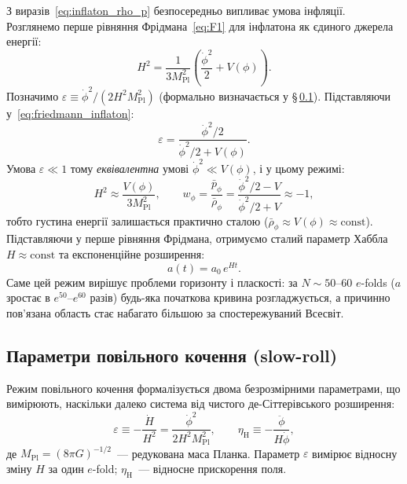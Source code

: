 \documentclass[12pt, a4paper]{article}
\begin{document}
З виразів~\eqref{eq:inflaton_rho_p} безпосередньо випливає умова
інфляції. Розглянемо перше рівняння Фрідмана~\eqref{eq:F1} для
інфлатона як єдиного джерела енергії:
\begin{equation}\label{eq:friedmann_inflaton}
  H^2 = \frac{1}{3M_\mathrm{Pl}^2}
        \left(\frac{\dot\phi^2}{2} + V(\phi)\right).
\end{equation}
Позначимо $\varepsilon \equiv \dot\phi^2/(2H^2 M_\mathrm{Pl}^2)$
(формально визначається у §\,\ref{subsec:slowroll}).
Підставляючи у~\eqref{eq:friedmann_inflaton}:
\begin{equation*}
  \varepsilon = \frac{\dot\phi^2/2}{\dot\phi^2/2 + V(\phi)}.
\end{equation*}
Умова $\varepsilon \ll 1$ тому \emph{еквівалентна} умові
$\dot\phi^2 \ll V(\phi)$, і у цьому режимі:
\begin{equation*}
  H^2 \approx \frac{V(\phi)}{3M_\mathrm{Pl}^2}, \qquad
  w_\phi = \frac{\bar{p}_\phi}{\bar{\rho}_\phi}
         = \frac{\dot\phi^2/2 - V}{\dot\phi^2/2 + V} \approx -1,
\end{equation*}
тобто густина енергії залишається практично сталою
($\bar{\rho}_\phi \approx V(\phi) \approx \mathrm{const}$).
Підставляючи у перше рівняння Фрідмана, отримуємо
сталий параметр Хаббла $H \approx \mathrm{const}$ та
експоненційне розширення:
\begin{equation*}
  a(t) = a_0\,e^{Ht}.
\end{equation*}
Саме цей режим вирішує проблеми горизонту і пласкості: за $N \sim
50$--$60$ $e$-folds ($a$ зростає в $e^{50}$--$e^{60}$ разів)
будь-яка початкова кривина розгладжується, а причинно пов'язана
область стає набагато більшою за спостережуваний Всесвіт.

\subsection{Параметри повільного кочення (slow-roll)}
\label{subsec:slowroll}

Режим повільного кочення формалізується двома безрозмірними
параметрами, що вимірюють, наскільки далеко система від чистого
де-Сіттерівського розширення:
\begin{equation}\label{eq:slow_roll_def}
  \varepsilon \equiv -\frac{\dot H}{H^2}
             = \frac{\dot\phi^2}{2H^2 M_\mathrm{Pl}^2},
  \qquad
  \eta_{\mathrm{H}} \equiv -\frac{\ddot{\phi}}{H\dot{\phi}},
\end{equation}
де $M_\mathrm{Pl} = (8\pi G)^{-1/2}$~--- редукована маса Планка.
Параметр $\varepsilon$ вимірює відносну зміну $H$ за один $e$-fold;
$\eta_{\mathrm{H}}$~--- відносне прискорення поля.
\end{document}
